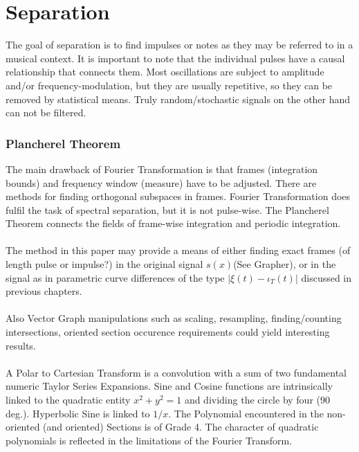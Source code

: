 \documentclass{report}
\begin{document}
\chapter{Separation}
The goal of separation is to find impulses or notes as they may be referred to in a musical context. It is important to note that the individual pulses have a causal relationship that connects them. Most oscillations are subject to amplitude and/or frequency-modulation, but they are usually repetitive, so they can be removed by statistical means. Truly random/stochastic signals on the other hand can not be filtered.

\subsection{Plancherel Theorem}
The main drawback of Fourier Transformation is that frames (integration bounds) and frequency window (measure) have to be adjusted. There are methods for finding orthogonal subspaces in frames. Fourier Transformation does fulfil the task of spectral separation, but it is not pulse-wise. The Plancherel Theorem connects the fields of frame-wise integration and periodic integration.\\\\
The method in this paper may provide a means of either finding exact frames (of length pulse or impulse?) in the original signal $s(x)$(See Grapher), or in the signal as in parametric curve differences of the type $\lvert \xi(t)-\iota_{T}(t) \rvert$ discussed in previous chapters.\\\\
Also Vector Graph manipulations such as scaling, resampling, finding/counting intersections, oriented section occurence requirements could yield interesting results.\\\\
A Polar to Cartesian Transform is a convolution with a sum of two fundamental numeric Taylor Series Expansions. Sine and Cosine functions are intrinsically linked to the quadratic entity $x^2 + y^2 =1$ and dividing the circle by four (90 deg.). Hyperbolic Sine is linked to $1/x$. The Polynomial encountered in the non-oriented (and oriented) Sections is of Grade 4. The character of quadratic polynomials is reflected in the limitations of the Fourier Transform.
\end{document}
